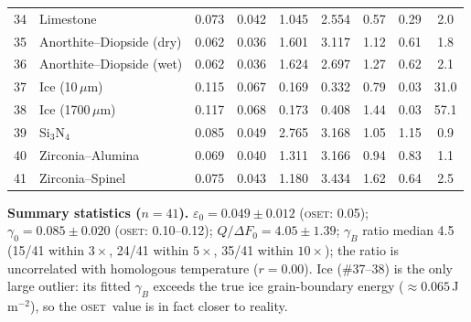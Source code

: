 \documentclass[11pt]{article}
\newcommand{\OSET}{\textsc{oset}}
\newcommand{\dF}{\Delta F_0}
\newcommand{\g}{\gamma_0}
\newcommand{\eps}{\varepsilon_0}
\begin{document}
\begin{longtable}{rlccccccc}
34 & Limestone               & 0.073 & 0.042 & 1.045 & 2.554 & 0.57 & 0.29 & 2.0\\
35 & Anorthite--Diopside (dry) & 0.062 & 0.036 & 1.601 & 3.117 & 1.12 & 0.61 & 1.8\\
36 & Anorthite--Diopside (wet) & 0.062 & 0.036 & 1.624 & 2.697 & 1.27 & 0.62 & 2.1\\
37 & Ice (10\,$\mu$m)        & 0.115 & 0.067 & 0.169 & 0.332 & 0.79 & 0.03 & 31.0\\
38 & Ice (1700\,$\mu$m)      & 0.117 & 0.068 & 0.173 & 0.408 & 1.44 & 0.03 & 57.1\\
39 & Si$_3$N$_4$             & 0.085 & 0.049 & 2.765 & 3.168 & 1.05 & 1.15 & 0.9\\
40 & Zirconia--Alumina       & 0.069 & 0.040 & 1.311 & 3.166 & 0.94 & 0.83 & 1.1\\
41 & Zirconia--Spinel        & 0.075 & 0.043 & 1.180 & 3.434 & 1.62 & 0.64 & 2.5\\
\end{longtable}

\noindent\textbf{Summary statistics ($n=41$).}
$\eps=0.049\pm0.012$ (\OSET: 0.05); $\g=0.085\pm0.020$ (\OSET: 0.10--0.12);
$Q/\dF=4.05\pm1.39$; $\gamma_B$ ratio median 4.5 (15/41 within $3\times$,
24/41 within $5\times$, 35/41 within $10\times$); the ratio is uncorrelated with
homologous temperature ($r=0.00$). Ice (\#37--38) is the only large outlier: its
fitted $\gamma_B$ exceeds the true ice grain-boundary energy
($\approx0.065$\,J\,m$^{-2}$), so the \OSET\ value is in fact closer to reality.

\clearpage


\end{document}
